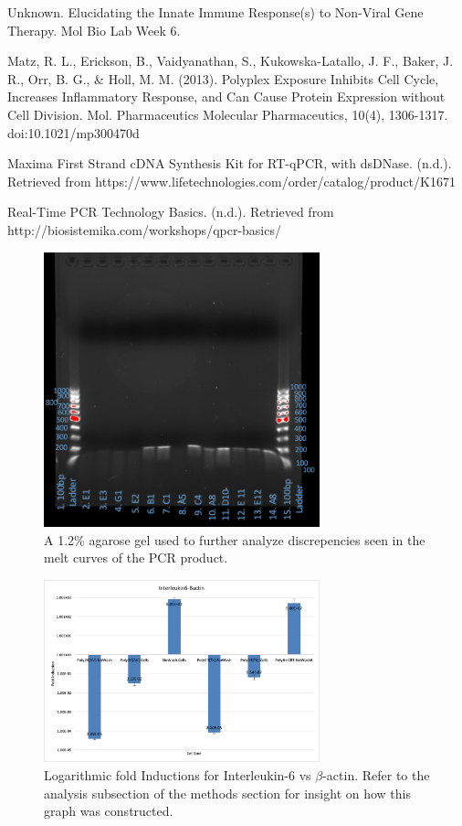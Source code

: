 \documentclass[journal, a4paper]{IEEEtran}
\begin{document}
\begin{thebibliography}{5}
  Unknown. Elucidating the Innate Immune Response(s) to Non-Viral Gene Therapy. Mol Bio Lab Week 6.

  Matz, R. L., Erickson, B., Vaidyanathan, S., Kukowska-Latallo, J. F., Baker, J. R., Orr, B. G., & Holl, M. M. (2013).
  Polyplex Exposure Inhibits Cell Cycle, Increases Inflammatory Response, and Can Cause Protein Expression without Cell Division.
  Mol. Pharmaceutics Molecular Pharmaceutics, 10(4), 1306-1317. doi:10.1021/mp300470d

  Maxima First Strand cDNA Synthesis Kit for RT-qPCR, with dsDNase. (n.d.). Retrieved from
  https://www.lifetechnologies.com/order/catalog/product/K1671

  Real-Time PCR Technology Basics. (n.d.). Retrieved from http://biosistemika.com/workshops/qpcr-basics/

\end{thebibliography}

    \begin{figure}[t]
      \centering
      \includegraphics[width=8cm]{supergel}
      \caption{A 1.2\% agarose gel used to further analyze discrepencies seen in the melt curves of the PCR product.}
      \label{fig:mesh1}
    \end{figure}

    \begin{figure}[t]
      \centering
      \includegraphics[width=8cm]{il6-bactin}
      \caption{Logarithmic fold Inductions for Interleukin-6 vs $\beta$-actin.
      Refer to the analysis subsection of the methods section for insight on how this graph was constructed.
      }
      \label{fig:mesh1}
    \end{figure}
\end{document}
